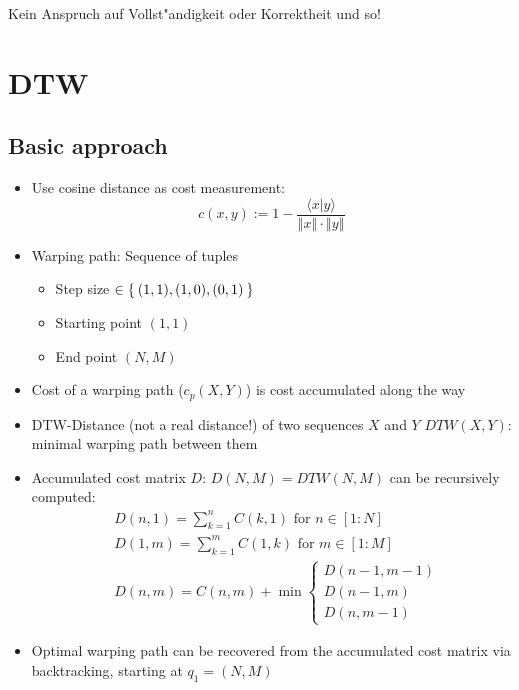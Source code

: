 \documentclass[fleqn,12pt]{scrartcl}
\newcommand{\absbb}[1]{
	\left \Vert #1 \right \Vert
}
\begin{document}
Kein Anspruch auf Vollst"andigkeit oder Korrektheit und so!

\section{DTW}
\subsection{Basic approach}

\begin{itemize}
	\item
		Use cosine distance as cost measurement:
		\begin{equation}
			c(x,y) := 1 - \frac{\langle x | y \rangle}{\absbb{x} \cdot \absbb{y}}
		\end{equation}
	\item
		Warping path: Sequence of tuples
		\begin{itemize}
			\item
				Step size  $\in \Set{(1,1), (1,0), (0,1)}$
			\item
				Starting point $(1,1)$
			\item
				End point $(N,M)$
		\end{itemize}
	\item
		Cost of a warping path ($c_p(X,Y)$) is cost accumulated along the way
	\item
		DTW-Distance (not a real distance!) of two sequences $X$ and $Y$ $DTW(X,Y)$: minimal warping path between them
	\item
		Accumulated cost matrix $D$: $D(N,M) = DTW(N,M)$ can be recursively computed:
		\begin{align}
			&D(n,1) = \sum_{k=1}^n C(k,1) \text{ for } n \in [1 : N]\\
			&D(1,m) = \sum_{k=1}^m C(1,k) \text{ for } m \in [1 : M]\\
			&D(n,m) = C(n,m) + \min \begin{cases}
				D(n-1,m-1)\\
				D(n-1,m)\\
				D(n,m-1)
			\end{cases}
		\end{align}
	\item
		Optimal warping path can be recovered from the accumulated cost matrix via backtracking, starting at $q_1 = (N,M)$
\end{itemize}
\end{document}
